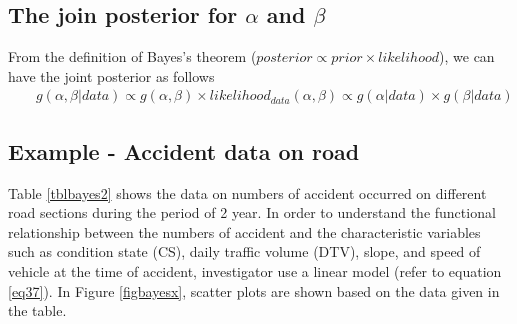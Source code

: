 \subsection{The join posterior for $\alpha$ and $\beta$}
From the definition of Bayes's theorem ($posterior \propto prior \times likelihood $), we can have the joint posterior as follows
\begin{eqnarray}
 && g(\alpha,\beta|data) \propto g(\alpha,\beta)\times likelihood_{data}(\alpha,\beta) \propto g(\alpha|data)\times g(\beta|data) \label{bayes23}
\end{eqnarray}
\subsection{Example - Accident data on road}
Table \ref{tblbayes2} shows the data on numbers of accident occurred on different road sections during the period of 2 year. In order to understand the functional relationship between the numbers of accident and the characteristic variables such as condition state (CS), daily traffic volume (DTV), slope, and speed of vehicle at the time of accident, investigator use a linear model (refer to equation \eqref{eq37}). In Figure \ref{figbayesx}, scatter plots are shown based on the data given in the table.

